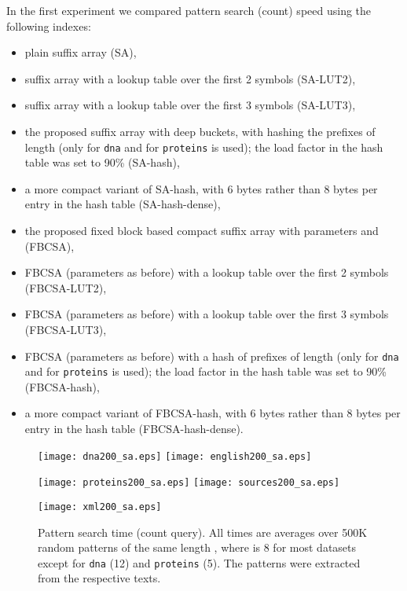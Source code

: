 \documentclass{cai}
\begin{document}
In the first experiment we compared pattern search (count) speed 
using the following indexes:
\begin{itemize}
\item plain suffix array (SA),
\item suffix array with a lookup table over the first 2 symbols (SA-LUT2),
\item suffix array with a lookup table over the first 3 symbols (SA-LUT3),
\item the proposed suffix array with deep buckets, 
      with hashing the prefixes of length  
      (only for \texttt{dna}  and for \texttt{proteins}  is used); 
      the load factor  in the hash table was set to 90\% (SA-hash),
\item a more compact variant of SA-hash, with 6 bytes rather than 8 bytes per 
      entry in the hash table (SA-hash-dense),
\item the proposed fixed block based compact suffix array with parameters  
      and  (FBCSA),
\item FBCSA (parameters as before) with a lookup table over the first 2 symbols 
      (FBCSA-LUT2),
\item FBCSA (parameters as before) with a lookup table over the first 3 symbols 
      (FBCSA-LUT3),
\item FBCSA (parameters as before) with a hash of prefixes of length  
      (only for \texttt{dna}  and for \texttt{proteins}  is used);
      the load factor in the hash table was set to 90\% (FBCSA-hash),
\item a more compact variant of FBCSA-hash, with 6 bytes rather than 8 bytes per 
      entry in the hash table (FBCSA-hash-dense).
\end{itemize}


\begin{figure}
\centerline{
\texttt{[image: dna200\_sa.eps]}
\texttt{[image: english200\_sa.eps]}
}
\centerline{
\texttt{[image: proteins200\_sa.eps]}
\texttt{[image: sources200\_sa.eps]}
}
\centerline{
\texttt{[image: xml200\_sa.eps]}
}
\caption[Results]
{Pattern search time (count query). 
All times are averages over 500K random patterns of the same length 
, where  is 8 for most datasets 
except for \texttt{dna} (12) and \texttt{proteins} (5). 
The patterns were extracted from the respective texts.}
\label{fig:times1a}
\end{figure}
\end{document}
